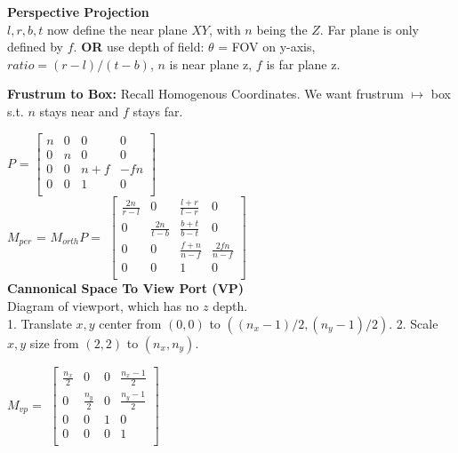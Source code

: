 \documentclass[letterpaper, 8pt]{extarticle}
\begin{document}
\begin{multicols*}{4}
\textbf{Perspective Projection}\\
$l,r,b,t$ now define the near plane $XY$, with $n$ being the $Z$. Far plane is only defined by $f$.
\textbf{OR} use depth of field:
$\theta$ = FOV on y-axis, $ratio = (r-l)/(t-b)$, $n$ is near plane z, $f$ is far plane z.

\textbf{Frustrum to Box:}
Recall Homogenous Coordinates. We want frustrum $\mapsto$ box s.t. $n$ stays near and $f$ stays far.

$P$ =
\(
\begin{bmatrix}
    n & 0 & 0   & 0   \\
    0 & n & 0   & 0   \\
    0 & 0 & n+f & -fn \\
    0 & 0 & 1   & 0   \\
\end{bmatrix}
\)\\
$M_{per}$ = $M_{orth}P =$
\(
\begin{bmatrix}
    \frac{2n}{r-l} & 0              & \frac{l+r}{l-r} & 0               \\
    0              & \frac{2n}{t-b} & \frac{b+t}{b-t} & 0               \\
    0              & 0              & \frac{f+n}{n-f} & \frac{2fn}{n-f} \\
    0              & 0              & 1               & 0               \\
\end{bmatrix}
\)\\

\textbf{Cannonical Space To View Port (VP)}\\

Diagram of viewport, which has no $z$ depth.\\
1. Translate $x,y$ center from $(0,0)$ to $((n_x-1)/2, (n_y-1)/2)$.
2. Scale $x,y$ size from $(2,2)$ to $(n_x, n_y)$.

$M_{vp} = $
\(
\begin{bmatrix}
    \frac{n_x}{2} & 0             & 0 & \frac{n_x-1}{2} \\
    0             & \frac{n_y}{2} & 0 & \frac{n_y-1}{2} \\
    0             & 0             & 1 & 0               \\
    0             & 0             & 0 & 1               \\
\end{bmatrix}
\)\\




\end{multicols*}
\end{document}
